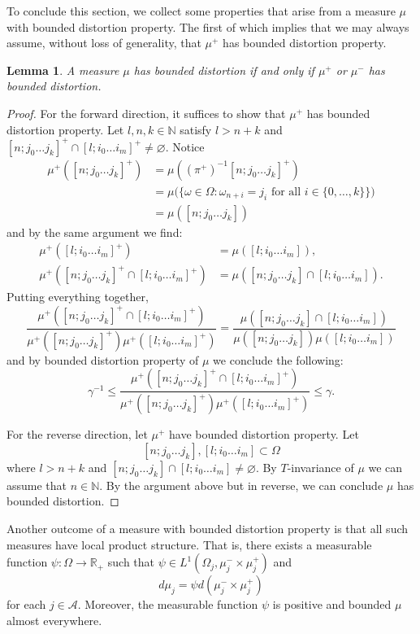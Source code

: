 \documentclass{amsart}
\newtheorem{lemma}{Lemma}
\newcommand{\NN}{\mathbb{N}}
\newcommand{\RR}{\mathbb{R}}
\newcommand{\A}{\mathcal{A}}
\begin{document}
To conclude this section, we collect some properties that arise from a measure $\mu$ with bounded distortion property. The first of which implies that we may always assume, without loss of generality, that $\mu^+$ has bounded distortion property.

\begin{lemma}\label{l.mupmbdp}
    A measure $\mu$ has bounded distortion if and only if $\mu^+$ or $\mu^-$ has bounded distortion.
\end{lemma}
\begin{proof}
    For the forward direction, it suffices to show that $\mu^+$ has bounded distortion property. Let $l,n,k\in \NN$ satisfy $l> n+k$ and $[n;j_0\dots j_k]^+ \cap [l; i_0\dots i_m]^+ \neq \varnothing$. Notice
    \begin{align*}
        \mu^+([n;j_0\dots j_k]^+) &= \mu((\pi^+)^{-1}[n;j_0\dots j_k]^+)\\
        &= \mu\Bigg(\Big\{\omega\in \Omega: \omega_{n+i} = j_i \text{ for all } i\in \{0,\dots, k\}\Big\} \Bigg)\\
        &= \mu([n;j_0\dots j_k])
    \end{align*}
    and by the same argument we find:
    \begin{align*}
        \mu^+([l; i_0\dots i_m]^+) &= \mu([l; i_0\dots i_m]),\\
        \mu^+([n;j_0\dots j_k]^+\cap [l; i_0\dots i_m]^+) &= \mu([n;j_0\dots j_k]\cap [l; i_0\dots i_m]).
    \end{align*}
    Putting everything together,
    \[\frac{\mu^+([n;j_0\dots j_k]^+\cap [l; i_0\dots i_m]^+)}{\mu^+([n;j_0\dots j_k]^+)\mu^+([l; i_0\dots i_m]^+)} = \frac{\mu([n;j_0\dots j_k]\cap [l; i_0\dots i_m])}{\mu([n;j_0\dots j_k])\mu([l; i_0\dots i_m])}\]
    and by bounded distortion property of $\mu$ we conclude the following:
    \[\gamma^{-1}\leq \frac{\mu^+([n;j_0\dots j_k]^+\cap [l; i_0\dots i_m]^+)}{\mu^+([n;j_0\dots j_k]^+)\mu^+([l; i_0\dots i_m]^+)}\leq \gamma.\]

    For the reverse direction, let $\mu^+$ have bounded distortion property. Let 
    \[[n;j_0\dots j_k], [l; i_0\dots i_m] \subset \Omega\] where $l> n+k$ and $[n;j_0\dots j_k] \cap [l; i_0\dots i_m] \neq \varnothing$. By $T$-invariance of $\mu$ we can assume that $n\in \NN$. By the argument above but in reverse, we can conclude $\mu$ has bounded distortion.
\end{proof}

Another outcome of a measure with bounded distortion property is that all such measures have local product structure. That is, there exists a measurable function $\psi: \Omega \rightarrow \RR_+$ such that $\psi\in L^1(\Omega_j, \mu_j^-\times\mu^+_j)$ and
\[d\mu_j = \psi d(\mu_j^-\times\mu^+_j)\]
for each $j\in \A$. Moreover, the measurable function $\psi$ is positive and bounded $\mu$ almost everywhere.
\end{document}
